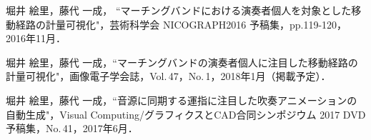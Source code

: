 \renewcommand{\refname}{公開文献}	
%
\begin{thebibliography}{55}
%
堀井 絵里，藤代 一成，
``マーチングバンドにおける演奏者個人を対象とした移動経路の計量可視化"，芸術科学会 NICOGRAPH2016 予稿集，pp.119-120，2016年11月．

堀井 絵里，藤代 一成，``マーチングバンドの演奏者個人に注目した移動経路の計量可視化"，画像電子学会誌，Vol.\,47，No.\,1，2018年1月（掲載予定）．

堀井 絵里，藤代 一成，``音源に同期する運指に注目した吹奏アニメーションの自動生成"，Visual Computing/グラフィクスとCAD合同シンポジウム 2017 DVD 予稿集，No.\,41，2017年6月．

\end{thebibliography}